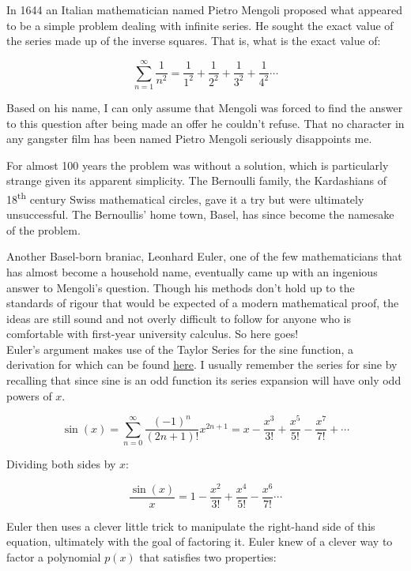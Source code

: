 \documentclass[11pt,titlepage]{article}
\begin{document}
In 1644 an Italian mathematician named Pietro Mengoli proposed what appeared to be a simple problem dealing with infinite series. He sought the exact value of the series made up of the inverse squares. That is, what is the exact value of:

$$\sum_{n=1}^{\infty} \frac{1}{n^2} = \frac{1}{1^2} + \frac{1}{2^2} + \frac{1}{3^2} + \frac{1}{4^2} \cdots$$

Based on his name, I can only assume that Mengoli was forced to find the answer to this question after being made an offer he couldn't refuse. That no character in any gangster film has been named Pietro Mengoli seriously disappoints me. 

For almost 100 years the problem was without a solution, which is particularly strange given its apparent simplicity. The Bernoulli family, the Kardashians of 18\textsuperscript{th} century Swiss mathematical circles, gave it a try but were ultimately unsuccessful. The Bernoullis' home town, Basel, has since become the namesake of the problem.

Another Basel-born braniac, Leonhard Euler, one of the few mathematicians that has almost become a household name, eventually came up with an ingenious answer to Mengoli's question. Though his methods don't hold up to the standards of rigour that would be expected of a modern mathematical proof, the ideas are still sound and not overly difficult to follow for anyone who is comfortable with first-year university calculus. So here goes!\\
 
Euler's argument makes use of the Taylor Series for the sine function, a derivation for which can be found \href{http://blogs.ubc.ca/infiniteseriesmodule/units/unit-3-power-series/taylor-series/maclaurin-expansion-of-sinx/}{here}. I usually remember the series for sine by recalling that since sine is an odd function its series expansion will have only odd powers of $x$. 

$$\sin(x) = \sum_{n=0}^{\infty} \frac{(-1)^n}{(2n+1)!} x^{2n+1} =  
x - \frac{x^3}{3!} + \frac{x^5}{5!} - \frac{x^7}{7!} + \cdots$$  

Dividing both sides by $x$:

\hypertarget{function}{ }
$$\frac{\sin(x)}{x} = 1 - \frac{x^2}{3!} + \frac{x^4}{5!} - \frac{x^6}{7!} \cdots$$

Euler then uses a clever little trick to manipulate the right-hand side of this equation, ultimately with the goal of factoring it. Euler knew of a clever way to factor a polynomial $p(x)$ that satisfies two properties:
\end{document}
